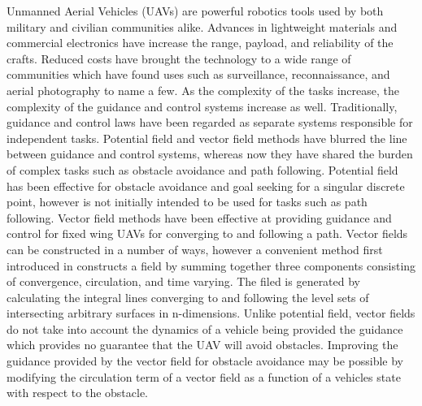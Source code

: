 \documentclass[numbered,pdftex]{ohio-etd}
\begin{document}
Unmanned Aerial Vehicles (UAVs) are powerful robotics tools used by both military and civilian communities alike. Advances in lightweight materials and commercial electronics have increase the range, payload, and reliability of the crafts. Reduced costs have brought the technology to a wide range of communities which have found uses such as surveillance, reconnaissance, and aerial photography to name a few. As the complexity of the tasks increase, the complexity of the guidance and control systems increase as well. Traditionally, guidance and control laws have been regarded as separate systems responsible for independent tasks. Potential field and vector field methods have blurred the line between guidance and control systems, whereas now they have shared the burden of complex tasks such as obstacle avoidance and path following. Potential field has been effective for obstacle avoidance and goal seeking for a singular discrete point, however is not initially intended to be used for tasks such as path following. Vector field methods have been effective at providing guidance and control for fixed wing UAVs for converging to and following a path. Vector fields can be constructed in a number of ways, however a convenient method first introduced in  constructs a field by summing together three components consisting of convergence, circulation, and time varying. The filed is generated by calculating the integral lines converging to and following the level sets of intersecting arbitrary surfaces in n-dimensions. Unlike potential field, vector fields do not take into account the dynamics of a vehicle being provided the guidance which provides no guarantee that the UAV will avoid obstacles. Improving the guidance provided by the vector field for obstacle avoidance may be possible by modifying the circulation term of a vector field as a function of a vehicles state with respect to the obstacle.
\end{document}
